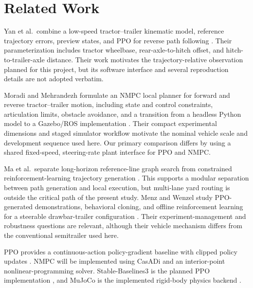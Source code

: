 \section{Related Work}

Yan et al.\ combine a low-speed tractor--trailer kinematic model, reference
trajectory errors, preview states, and PPO for reverse path following
\cite{yan2024trajectory}. Their parameterization includes tractor wheelbase,
rear-axle-to-hitch offset, and hitch-to-trailer-axle distance. Their work
motivates the trajectory-relative observation planned for this project, but its
software interface and several reproduction details are not adopted verbatim.

Moradi and Mehrandezh formulate an NMPC local planner for forward and reverse
tractor--trailer motion, including state and control constraints, articulation
limits, obstacle avoidance, and a transition from a headless Python model to a
Gazebo/ROS implementation \cite{moradi2022nmpc}. Their compact experimental
dimensions and staged simulator workflow motivate the nominal vehicle scale
and development sequence used here. Our primary comparison differs by using a
shared fixed-speed, steering-rate plant interface for PPO and NMPC.

Ma et al.\ separate long-horizon reference-line graph search from constrained
reinforcement-learning trajectory generation \cite{ma2025hierarchical}. This
supports a modular separation between path generation and local execution, but
multi-lane yard routing is outside the critical path of the present study.
Menz and Wenzel study PPO-generated demonstrations, behavioral cloning, and
offline reinforcement learning for a steerable drawbar-trailer configuration
\cite{menz2026imitation}. Their experiment-management and robustness questions
are relevant, although their vehicle mechanism differs from the conventional
semitrailer used here.

PPO provides a continuous-action policy-gradient baseline with clipped policy
updates \cite{schulman2017ppo}. NMPC will be implemented using CasADi
\cite{andersson2019casadi} and an interior-point nonlinear-programming solver.
Stable-Baselines3 is the planned PPO implementation \cite{raffin2021sb3}, and
MuJoCo is the implemented rigid-body physics backend \cite{todorov2012mujoco}.
